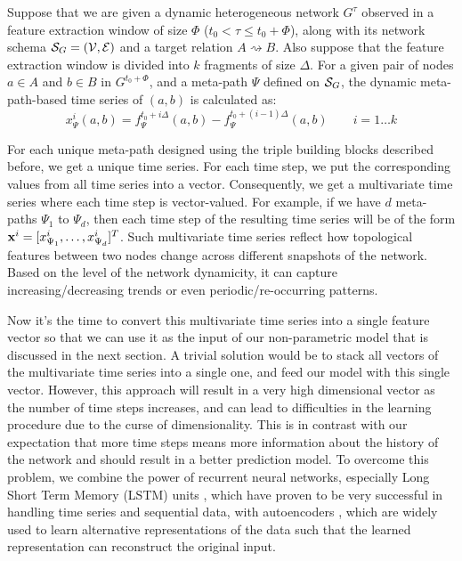 \begin{definition}
	Suppose that we are given a dynamic heterogeneous network $G^{\tau}$ observed in a feature extraction window of size $\Phi$ ($t_0<\tau \le t_0+\Phi$), along with its network schema $\mathcal{S}_G=(\mathcal{V}, \mathcal{E})$ and a target relation $A\rightsquigarrow B$. Also suppose that the feature extraction window is divided into $k$ fragments of size $\Delta$. For a given pair of nodes $a\in A$ and $b\in B$ in $G^{t_0+\Phi}$, and a meta-path $\Psi$ defined on $\mathcal{S}_G$, the dynamic meta-path-based time series of $(a,b)$ is calculated as:
	\begin{equation*}
		x_{\Psi}^i(a,b)=f_{\Psi}^{t_0+i\Delta}(a,b) - f_{\Psi}^{t_0+(i-1)\Delta}(a,b)\quad\quad i=1\dots k
	\end{equation*}
\end{definition}

For each unique meta-path designed using the triple building blocks described before, we get a unique time series. For each time step, we put the corresponding values from all time series into a vector. Consequently, we get a multivariate time series where each time step is vector-valued. For example, if we have $d$ meta-paths $\Psi_1$ to $\Psi_d$, then each time step of the resulting time series will be of the form $\mathbf{x}^i=[x_{\Psi_1}^i,\dots,x_{\Psi_d}^i]^T$. Such multivariate time series reflect how topological features between two nodes change across different snapshots of the network. Based on the level of the network dynamicity, it can capture increasing/decreasing trends or even periodic/re-occurring patterns.

Now it's the time to convert this multivariate time series into a single feature vector so that we can use it as the input of our non-parametric model that is discussed in the next section. A trivial solution would be to stack all vectors of the multivariate time series into a single one, and feed our model with this single vector. However, this approach will result in a very high dimensional vector as the number of time steps increases, and can lead to difficulties in the learning procedure due to the curse of dimensionality. This is in contrast with our expectation that more time steps means more information about the history of the network and should result in a better prediction model. To overcome this problem, we combine the power of recurrent neural networks, especially Long Short Term Memory (LSTM) units \cite{hochreiter1997long}, which have proven to be very successful in handling time series and sequential data, with autoencoders \cite{bengio2009learning}, which are widely used to learn alternative representations of the data such that the learned representation can reconstruct the original input.

